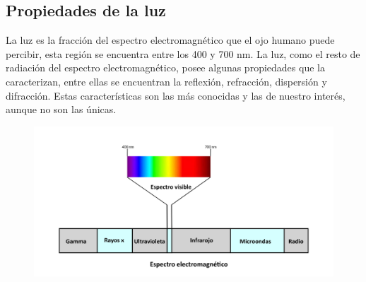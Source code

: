 \documentclass[10pt,a4paper]{article}
\begin{document}
\subsection{Propiedades de la luz}
La luz es la fracción del espectro electromagnético que el ojo humano puede percibir, esta región se encuentra entre los 400 y 700 nm. La luz, como el resto de radiación del espectro electromagnético, posee algunas propiedades que la caracterizan, entre ellas se encuentran la reflexión, refracción, dispersión y difracción. Estas características son las más conocidas y las de nuestro interés, aunque no son las únicas.
\begin{figure}[H]
\centering
\includegraphics[scale=0.18]{Imagenes/Espectro_01}
\end{figure}
\end{document}
